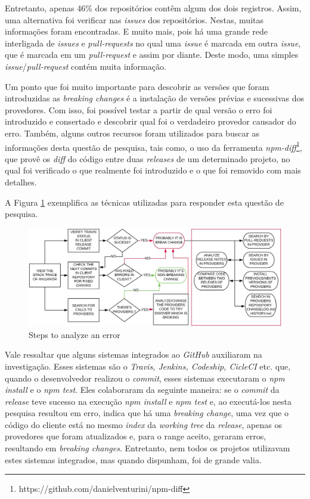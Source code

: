 Entretanto, apenas 46\% dos repositórios contêm algum dos dois registros. Assim, uma alternativa foi verificar nas \textit{issues} dos repositórios. Nestas, muitas informações foram encontradas. E muito mais, pois há uma grande rede interligada de \textit{issues} e \textit{pull-requests} no qual uma \textit{issue} é marcada em outra \textit{issue}, que é marcada em um \textit{pull-request} e assim por diante. Deste modo, uma simples \textit{issue}/\textit{pull-request} contém muita informação.

Um ponto que foi muito importante para descobrir as versões que foram introduzidas as \textit{breaking changes} é a instalação de versões prévias e sucessivas dos provedores. Com isso, foi possível testar a partir de qual versão o erro foi introduzido e consertado e descobrir qual foi o verdadeiro provedor causador do erro. Também, alguns outros recursos foram utilizados para buscar as informações desta questão de pesquisa, tais como, o uso da ferramenta \textit{npm-diff}\footnote{https://github.com/danielventurini/npm-diff}, que provê os \textit{diff} do código entre duas \textit{releases} de um determinado projeto, no qual foi verificado o que realmente foi introduzido e o que foi removido com mais detalhes.

A Figura \ref{fig:step_analyze} exemplifica as técnicas utilizadas para responder esta questão de pesquisa.

\begin{figure}
    \centering
    \includegraphics[scale=0.35]{figuras/step_analyze.jpeg}
    \caption{Steps to analyze an error}
    \label{fig:step_analyze}
\end{figure}

Vale ressaltar que alguns sistemas integrados ao \textit{GitHub} auxiliaram na investigação. Esses sistemas são o \textit{Travis, Jenkins, Codeship, CicleCI} etc. que, quando o desenvolvedor realizou o \textit{commit}, esses sistemas executaram o \textit{npm install} e o \textit{npm test}. Eles colaboraram da seguinte maneira: se o \textit{commit} da \textit{release} teve sucesso na execução \textit{npm install} e \textit{npm test} e, ao executá-los nesta pesquisa resultou em erro, indica que há uma \textit{breaking change}, uma vez que o código do cliente está no mesmo \textit{index} da \textit{working tree} da \textit{release}, apenas os provedores que foram atualizados e, para o range aceito, geraram erros, resultando em \textit{breaking changes}. Entretanto, nem todos os projetos utilizavam estes sistemas integrados, mas quando dispunham, foi de grande valia.


